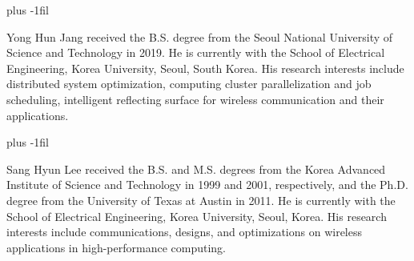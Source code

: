 \documentclass[journal]{IEEEtran}
\begin{document}
\baselineskip plus -1fil

\begin{IEEEbiographynophoto}
{Yong Hun Jang} %
received the B.S. degree from the Seoul National University of Science and Technology in 2019. He is currently with the School of Electrical Engineering, Korea University, Seoul, South Korea. His research interests include distributed system optimization, computing cluster parallelization and job scheduling, intelligent reflecting surface for wireless communication and their applications.
\end{IEEEbiographynophoto}

\baselineskip plus -1fil

\begin{IEEEbiographynophoto}
{Sang Hyun Lee} %
received the B.S. and M.S. degrees from the Korea Advanced Institute of Science and Technology in 1999 and 2001, respectively, and the Ph.D. degree from the University of Texas at Austin in 2011. He is currently with the School of Electrical Engineering, Korea University, Seoul, Korea. His research interests include communications, designs, and optimizations on wireless applications in high-performance computing.
\end{IEEEbiographynophoto}
\end{document}
